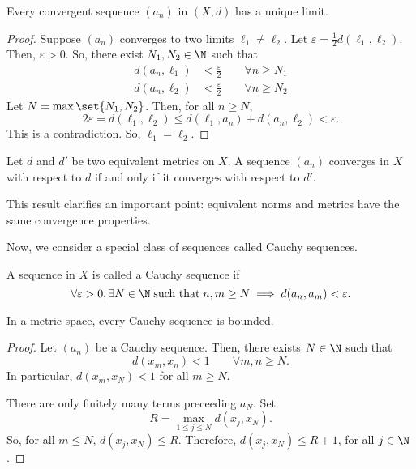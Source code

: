 \documentclass[draft]{penrose}
\begin{document}
\begin{nlemma}
  Every convergent sequence $(a_n)$ in $(X,d)$ has a unique limit.
\end{nlemma}
\begin{proof}
  Suppose $(a_n)$ converges to two limits $\ell_1 \neq \ell_2$. Let $\varepsilon = \frac{1}{2} d(\ell_1,\ell_2)$. Then, $\varepsilon > 0$. So, there exist $N_1, N_2 \in \N$ such that
  \begin{align*}
    d(a_n, \ell_1) &< \frac{\varepsilon}{2} \qquad\forall n \geq N_1\\
    d(a_n, \ell_2) &< \frac{\varepsilon}{2} \qquad\forall n \geq N_2
  \end{align*}
  Let $N = \max\set{N_1, N_2}$. Then, for all $n \geq N$,
  \begin{equation*}
    2\varepsilon = d(\ell_1, \ell_2)
    \leq d(\ell_1, a_n) + d(a_n, \ell_2) < \varepsilon.
  \end{equation*}
  This is a contradiction. So, $\ell_1 = \ell_2$.
\end{proof}

\begin{nprop}
  Let $d$ and $d'$ be two equivalent metrics on $X$. A sequence $(a_n)$ converges in $X$ with respect to $d$ if and only if it converges with respect to $d'$.
\end{nprop}
This result clarifies an important point: equivalent norms and metrics have the same convergence properties.

Now, we consider a special class of sequences called Cauchy sequences.
\begin{ndfn}
  A sequence in $X$ is called a Cauchy sequence if
  \begin{equation*}
  \forall \varepsilon > 0, \exists N \in \N\;\text{such that}\;n,m \geq N \implies d(a_n, a_m) < \varepsilon.
  \end{equation*}
\end{ndfn}

\begin{nthm}
  In a metric space, every Cauchy sequence is bounded.
\end{nthm}
\begin{proof}
  Let $(a_n)$ be a Cauchy sequence. Then, there exists $N \in \N$ such that
  \begin{equation*}
    d(x_m, x_n) < 1 \qquad\forall m,n \geq N.
  \end{equation*}
  In particular, $d(x_m, x_N) < 1$ for all $m \geq N$.

  There are only finitely many terms preceeding $a_N$. Set
  \begin{equation*}
    R = \max_{1 \leq j \leq N} d(x_j, x_N).
  \end{equation*}
  So, for all $m \leq N$, $d(x_j, x_N) \leq R$. Therefore, $d(x_j, x_N) \leq R + 1$, for all $j \in \N$.
\end{proof}
\end{document}
